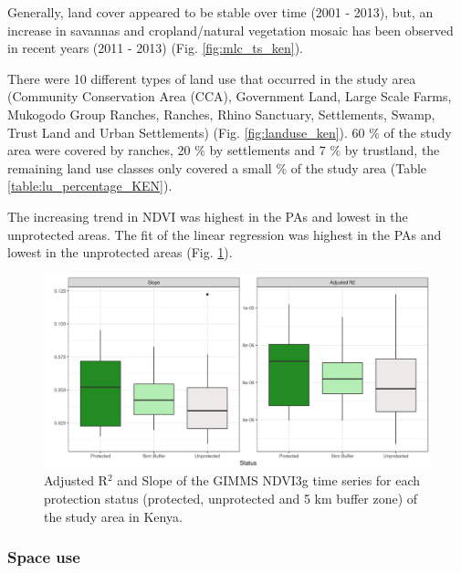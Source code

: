 \documentclass[12pt,a4paper, twoside, english]{article}
\begin{document}
Generally, land cover appeared to be stable over time (2001 - 2013), but, an increase in savannas and cropland/natural vegetation mosaic has been observed in recent years (2011 - 2013) (Fig. \ref{fig:mlc_ts_ken}).

There were 10 different types of land use that occurred in the study area (Community Conservation Area (CCA), Government Land, Large Scale Farms, Mukogodo Group Ranches, Ranches, Rhino Sanctuary, Settlements, Swamp, Trust Land and Urban Settlements) (Fig. \ref{fig:landuse_ken}). 60 \% of the study area were covered by ranches, 20 \% by settlements and 7 \% by trustland, the remaining land use classes only covered a small \% of the study area (Table \ref{table:lu_percentage_KEN}).



The increasing trend in NDVI was highest in the PAs and lowest in the unprotected areas. The fit of the linear regression was highest in the PAs and lowest in the unprotected areas (Fig. \ref{fig:gimms_status_ken}).

\begin{figure}[H]
  \centering
  \includegraphics[width=\textwidth]{figures/Gimms_Status_NDVI_KEN.png}
  \caption[NDVI trend by protection status in Laikipia]{Adjusted R$^{2}$ and Slope of the GIMMS NDVI3g time series for each protection status (protected, unprotected and 5 km buffer zone) of the study area in Kenya.}
  \label{fig:gimms_status_ken}
\end{figure}

\subsubsection{Space use} 

\end{document}
